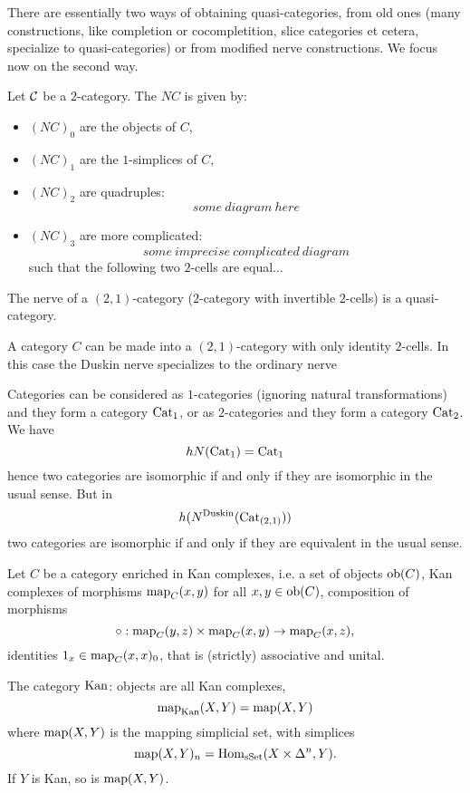 \begin{example}
There are essentially two ways of obtaining quasi-categories, from old ones (many constructions, like completion or cocompletition, slice categories et cetera, specialize to quasi-categories) or from modified nerve constructions. We focus now on the second way.

Let $\mathcal{C}$ be a $2$-category. The  $NC$ is given by:
\begin{itemize}
    \item $(NC)_0$ are the objects of $C$,
    \item $(NC)_1$ are the $1$-simplices of $C$,
    \item $(NC)_2$ are quadruples:
    \[some\ diagram\ here\]
    \item $(NC)_3$ are more complicated:
    \[some\ imprecise\ complicated\ diagram\]
    such that the following two $2$-cells are equal...
\end{itemize}
\end{example}

\begin{theorem}
The nerve of a $(2,1)$-category ($2$-category with invertible $2$-cells) is a quasi-category.
\end{theorem}

\begin{remark}
A category $C$ can be made into a $(2,1)$-category with only identity $2$-cells. In this case the Duskin nerve specializes to the ordinary nerve
\end{remark}

\begin{example}
Categories can be considered as $1$-categories (ignoring natural transformations) and they form a category ${\mathrm{Cat}}_1$, or as $2$-categories and they form a category ${\mathrm{Cat}}_2$.
We have
\[hN({\mathrm{Cat}}_1)={\mathrm{Cat}}_1\]
hence two categories are isomorphic if and only if they are isomorphic in the usual sense.
But in
\[h(N^\text{Duskin}({\mathrm{Cat}}_{(2,1)}))\]
two categories are isomorphic if and only if they are equivalent in the usual sense.
\end{example}

Let $C$ be a category enriched in Kan complexes, i.e. a set of objects $\operatorname{ob}(C)$, Kan complexes of morphisms $\operatorname{map}_C(x,y)$ for all $x,y\in\operatorname{ob}(C)$, composition of morphisms
\[\circ:\operatorname{map}_C(y,z)\times\operatorname{map}_C(x,y)\to\operatorname{map}_C(x,z),\]
identities $1_x\in\operatorname{map}_C(x,x)_0$, that is (strictly) associative and unital.

\begin{example}
The category ${\mathrm{Kan}}$: objects are all Kan complexes,
\[\operatorname{map}_{\mathrm{Kan}}(X,Y)=\operatorname{map}(X,Y)\]
where $\operatorname{map}(X,Y)$ is the mapping simplicial set, with simplices
\[\operatorname{map}(X,Y)_n=\operatorname{Hom}_{\mathrm{sSet}}(X\times\Delta^n,Y).\]
If $Y$ is Kan, so is $\operatorname{map}(X,Y)$.
\end{example}

